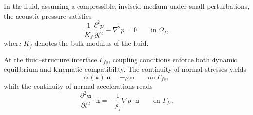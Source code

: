 \documentclass{article}
\begin{document}
In the fluid, assuming a compressible, inviscid medium under small perturbations, the acoustic pressure satisfies
\begin{equation}
\frac{1}{K_f} \frac{\partial^2 p}{\partial t^2} - \nabla^2 p = 0 \qquad \text{in } \Omega_f,
\end{equation}
where $K_f$ denotes the bulk modulus of the fluid.

At the fluid–structure interface $\Gamma_{fs}$, coupling conditions enforce both dynamic equilibrium and kinematic compatibility. The continuity of normal stresses yields
\begin{equation}
\boldsymbol{\sigma}(\mathbf{u}) \, \mathbf{n} = - p \, \mathbf{n} \qquad \text{on } \Gamma_{fs},
\end{equation}
while the continuity of normal accelerations reads
\begin{equation}
\frac{\partial^2 \mathbf{u}}{\partial t^2} \cdot \mathbf{n} = - \frac{1}{\rho_f} \nabla p \cdot \mathbf{n} \qquad \text{on } \Gamma_{fs}.
\end{equation}
\end{document}
